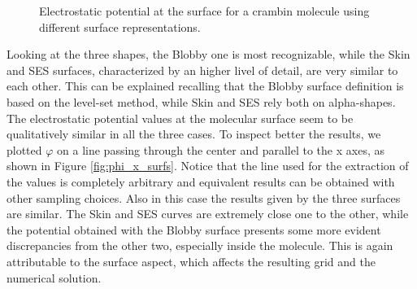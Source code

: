 \documentclass[11pt,a4paper]{article}
\begin{document}
\begin{figure}[H]
{    }
    \quad
    \caption[]{Electrostatic potential at the surface for a crambin molecule using different surface representations.}
    \label{fig:crambin}
\end{figure}

Looking at the three shapes, the Blobby one is most recognizable, while 
the Skin and SES surfaces, characterized by an higher livel of detail, are very similar to each other. This can be explained recalling that the Blobby surface definition is based on the level-set method, while Skin and SES rely both on alpha-shapes. \\
The electrostatic potential values at the molecular surface seem to be qualitatively similar in all the three cases. To inspect better the results, we plotted $\varphi$ on a line passing through the center and parallel to the x axes, as shown in Figure \ref{fig:phi_x_surfs}. Notice that the line used for the extraction of the values is completely arbitrary and equivalent results can be obtained with other sampling choices. Also in this case the results given by the three surfaces are similar. The Skin and SES curves are extremely close one to the other, while the potential obtained with the Blobby surface presents some more evident discrepancies from the other two, especially inside the molecule. This is again attributable to the surface aspect, which affects the resulting grid and the numerical solution. 
\end{document}
